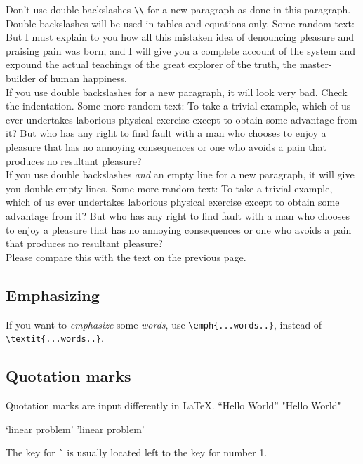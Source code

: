 \documentclass[letterpaper, 11pt]{article}
\newenvironment{example}
 {\VerbatimOut{\jobname.tmp}}
 {\endVerbatimOut
 \begin{center}
 \fbox{
	 \begin{minipage}[c]{0.48\textwidth}
	  
	 \end{minipage}
   }
 \fbox{
 	\begin{minipage}[c]{0.38\textwidth}
 	 \scriptsize
	 
  	\end{minipage}
  }
  \end{center}
 }
\newenvironment{textexample}
 {\VerbatimOut{\jobname.tmp}}
 {\endVerbatimOut
  \lstset{basicstyle=\linespread{1.0}\ttfamily\footnotesize}
  \begin{framed}\end{framed}
  
 \begin{framed}\noindent\end{framed}
}
\begin{document}
\begin{textexample}
Don't use double backslashes \verb|\\| for a new paragraph as done in this paragraph.
Double backslashes will be used in tables and equations only.
Some random text: But I must explain to you how all this mistaken idea of denouncing pleasure and praising pain was born, and I will give you a complete account of the system and expound the actual teachings of the great explorer of the truth, the master-builder of human happiness. \\
If you use double backslashes for a new paragraph, it will look very bad. Check the indentation.
Some more random text: To take a trivial example, which of us ever undertakes laborious physical exercise except to obtain some advantage from it? But who has any right to find fault with a man who chooses to enjoy a pleasure that has no annoying consequences or one who avoids a pain that produces no resultant pleasure?\\

If you use double backslashes \emph{and} an empty line for a new paragraph, it will give you double empty lines.
Some more random text: To take a trivial example, which of us ever undertakes laborious physical exercise except to obtain some advantage from it? But who has any right to find fault with a man who chooses to enjoy a pleasure that has no annoying consequences or one who avoids a pain that produces no resultant pleasure?\\
Please compare this with the text on the previous page.
\end{textexample}

\newpage

\subsection{Emphasizing}
If you want to \emph{emphasize} some \emph{words}, use \verb|\emph{...words..}|, instead of \verb|\textit{...words..}|.

\subsection{Quotation marks}

Quotation marks are input differently in LaTeX.
\begin{example}
``Hello World''
"Hello World"

`linear problem'
'linear problem'
\end{example}
The key for \verb|`| is usually located left to the key for number 1.
\end{document}
